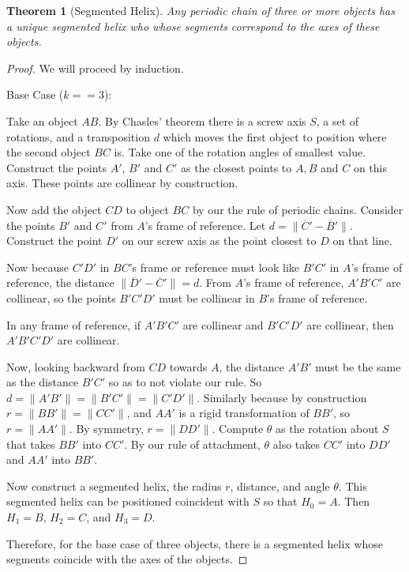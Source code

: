 \documentclass[11pt]{article}
\newtheorem{theorem}{Theorem}
\begin{document}
{\begin{theorem}[Segmented Helix]
  Any periodic chain of three or more objects has a unique segmented helix who
  whose segments correspond
  to the axes of these objects.
\end{theorem}

\begin{proof}
  We will proceed by induction.

  Base Case ($k == 3$):

  Take an object $AB$. By Chasles' theorem\cite{wiki:chasles}
    there is a screw axis $S$, a set of rotations,  and a transposition $d$ which moves the first object to
    position where the second object $BC$ is. Take one of the rotation angles of smallest value.
    Construct the points $A'$, $B'$ and $C'$ as the closest points
  to $A,B$ and $C$ on this axis. These points are collinear by construction.

  Now add the object $CD$ to object $BC$ by our the rule of periodic chains. Consider the points
  $B'$ and $C'$ from $A$'s frame of reference. Let $d = \| \overline C' - \overline B' \|$.
  Construct the point $D'$ on our screw axis as the point closest to $D$ on that line.

  Now because $C'D'$ in $BC$'s frame or reference must look like $B'C'$ in $A$'s frame of reference,
  the distance $\| \overline D' - \overline C' \| = d$.
  From $A$'s frame of reference, $A'B'C'$ are collinear, so the points $B'C'D'$ must be collinear in
  $B$'s frame of reference.

  In any frame of reference, if $A'B'C'$ are collinear and $B'C'D'$ are collinear, then $A'B'C'D'$
  are collinear.

  Now, looking backward from $CD$ towards $A$, the distance $A'B'$ must be the same as the
  distance $B'C'$ so as to not violate our rule. So $d = \| A'B' \| = \| B'C' \| = \| C'D'\|$.
  Similarly because by construction $r = \| B B' \| = \| C C' \|$, and $AA'$ is a rigid
  transformation of $BB'$, so $r = \| A A' \|$. By symmetry, $r = \| D D' \|$.
  Compute $\theta$ as the rotation about $S$ that takes $B B'$ into $C C'$. By our rule
  of attachment, $\theta$ also takes $C C'$ into $D D'$ and $A A'$ into $B B'$.

  Now construct a segmented helix, the radius $r$, distance,
  and angle $\theta$. This segmented helix can be positioned coincident with $S$ so
  that $H_0 = A$. Then $H_1=B$, $H_2=C$, and $H_3=D$.

  Therefore, for the base case of three objects, there is a segmented helix whose
  segments coincide with the axes of the objects.



\end{proof}}
\end{document}
